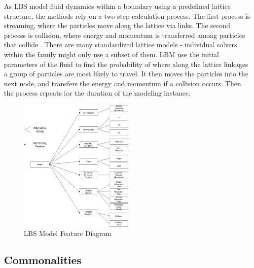 \documentclass[12pt, notitlepage]{article}
\begin{document}
As LBS model fluid dynamics within a boundary using a predefined lattice structure, the methods rely on a two step calculation process. The first process is streaming, where the particles move along the lattice via links. The second process is collision, where energy and momentum is transferred among particles that collide \citep{bao2011lattice}.
There are many standardized lattice models - individual solvers within the family might only use a subset of them.
LBM use the initial parameters of the fluid to find the probability of where along the lattice linkages a group of particles are most likely to travel. It then moves the particles into the next node, and transfers the energy and momentum if a collision occurs. Then the process repeats for the duration of the modeling instance.

\begin{figure}[h!]
	\begin{center}
		\includegraphics[width=0.5\textwidth]{FeatureDiagramLBS}
		\caption{LBS Model Feature Diagram}
		\label{LBSFeatureDiagram}
	\end{center}
\end{figure} 

\subsection{Commonalities}\label{comm_sec}
\end{document}
